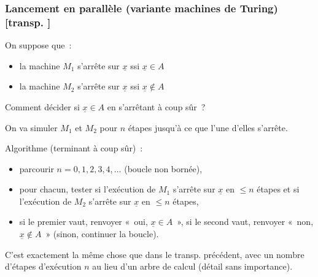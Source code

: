 \documentclass[mathserif,a4paper,aspectratio=169]{beamer}
\renewcommand{\frametitle}[1]{\subsubsection*{#1 {\footnotesize[transp. \insertframenumber]}}}
\begin{document}
\begin{frame}
\frametitle{Lancement en parallèle (variante machines de Turing)}

On suppose que :
\begin{itemize}
\item la machine $M_1$ s'arrête sur $\underline{x}$ ssi $\underline{x}
  \in A$
\item la machine $M_2$ s'arrête sur $\underline{x}$ ssi $\underline{x}
  \not\in A$
\end{itemize}
Comment décider si $\underline{x} \in A$ en s'arrêtant à coup sûr ?

\bigskip

On va simuler $M_1$ et $M_2$ pour $n$ étapes jusqu'à ce que l'une
d'elles s'arrête.

\bigskip

Algorithme (terminant à coup sûr) :
\begin{itemize}
\item parcourir $n=0,1,2,3,4,\ldots$ (boucle non bornée),
\item pour chacun, tester si l'exécution de $M_1$ s'arrête sur
  $\underline{x}$ en $\leq n$ étapes et si l'exécution de $M_2$
  s'arrête sur $\underline{x}$ en $\leq n$ étapes,
\item si le premier vaut, renvoyer « oui, $\underline{x}\in A$ », si
  le second vaut, renvoyer « non, $\underline{x}\not\in A$ » (sinon,
  continuer la boucle).
\end{itemize}

\bigskip

{\footnotesize C'est \alert{exactement la même chose} que dans le
  transp. précédent, avec un nombre d'étapes d'exécution $n$ au lieu
  d'un arbre de calcul (détail sans importance).\par}

\end{frame}
%
\end{document}
